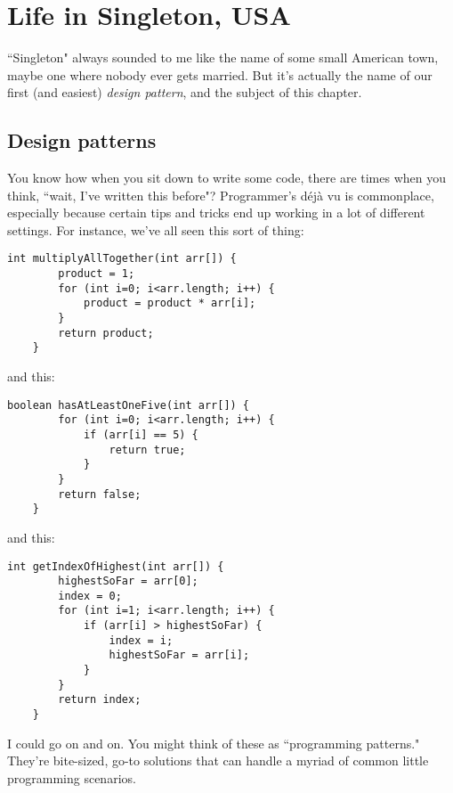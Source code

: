 
\chapter{Life in Singleton, USA}

``Singleton" always sounded to me like the name of some small American town,
maybe one where nobody ever gets married. But it's actually the name of our
first (and easiest) \textit{design pattern}, and the subject of this chapter.

\section{Design patterns}

You know how when you sit down to write some code, there are times when you
think, ``wait, I've written this before"? Programmer's d\'{e}j\`{a} vu is
commonplace, especially because certain tips and tricks end up working in
a lot of different settings. For instance, we've all seen this sort of thing:

\vspace{-.1in}
\begin{Verbatim}[fontsize=\small]
    int multiplyAllTogether(int arr[]) {
        product = 1;
        for (int i=0; i<arr.length; i++) {
            product = product * arr[i];
        }
        return product;
    }
\end{Verbatim}

and this:

\pagebreak
\begin{Verbatim}[fontsize=\small]
    boolean hasAtLeastOneFive(int arr[]) {
        for (int i=0; i<arr.length; i++) {
            if (arr[i] == 5) {
                return true;
            }
        }
        return false;
    }
\end{Verbatim}

and this:

\begin{samepage}
\begin{Verbatim}[fontsize=\small]
    int getIndexOfHighest(int arr[]) {
        highestSoFar = arr[0];
        index = 0;
        for (int i=1; i<arr.length; i++) {
            if (arr[i] > highestSoFar) {
                index = i;
                highestSoFar = arr[i];
            }
        }
        return index;
    }
\end{Verbatim}
\end{samepage}

I could go on and on. You might think of these as ``programming patterns."
They're bite-sized, go-to solutions that can handle a myriad of common little
programming scenarios.

